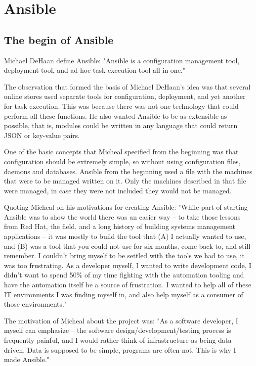 \documentclass[12pt,a4paper,openright,twoside]{book}
\begin{document}
\chapter{Ansible}

\section{The begin of Ansible}

Michael DeHaan define Ansible:
"Ansible is a configuration management tool, deployment tool, and ad-hoc task execution tool all in one."

The observation that formed the basis of Michael DeHaan's idea was that several online stores used separate tools for configuration, deployment, and yet another for task execution. This was because there was not one technology that could perform all these functions.
He also wanted Ansible to be as extensible as possible, that is, modules could be written in any language that could return JSON or key-value pairs.

One of the basic concepts that Micheal specified from the beginning was that configuration should be extremely simple, so without using configuration files, daemons and databases. Ansible from the beginning used a file with the machines that were to be managed written on it. Only the machines described in that file were managed, in case they were not included they would not be managed.

Quoting Micheal on his motivations for creating Ansible:
"While part of starting Ansible was to show the world there was an easier way -- to take those lessons from Red Hat, the field, and a long history of building systems management applications -- it was mostly to build the tool that (A) I actually wanted to use, and (B) was a tool that you could not use for six months, come back to, and still remember. I couldn't bring myself to be settled with the tools we had to use, it was too frustrating. As a developer myself, I wanted to write development code, I didn't want to spend 50\% of my time fighting with the automation tooling and have the automation itself be a source of frustration. I wanted to help all of these IT environments I was finding myself in, and also help myself as a consumer of those environments."

The motivation of Micheal about the project was:
"As a software developer, I myself can emphasize -- the software design/development/testing process is frequently painful, and I would rather think of infrastructure as being data-driven. Data is supposed to be simple, programs are often not. This is why I made Ansible."
\end{document}
